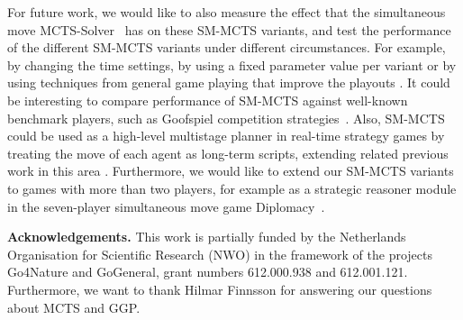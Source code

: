 \documentclass[conference]{IEEEtran}
\begin{document}
For future work, we would like to also measure the effect that the simultaneous move MCTS-Solver~\cite[Chapter 6]{Finnsson12} has on these 
SM-MCTS variants, and test the performance of the different SM-MCTS variants under different circumstances. For example, by changing the time settings, 
by using a fixed parameter value per variant or by using techniques from general game playing that improve the playouts \cite{Bjornsson09CadiaPlayer}.
It could be interesting to compare performance of SM-MCTS against well-known benchmark players, such as Goofspiel competition 
strategies~\cite{Dror13Repeated}.
Also, SM-MCTS could be used as a high-level multistage planner in real-time strategy games by treating the move of each agent
as long-term scripts, extending related previous work in this area \cite{Sailor07adversarial}. 
Furthermore, we would like to extend our SM-MCTS variants to games with more than two players, for example as a strategic reasoner 
module in the seven-player simultaneous move game Diplomacy~\cite{Fabregues11DipGame}.

{\bf Acknowledgements.} {\small This work is partially funded by the Netherlands Organisation for
Scientific Research (NWO) in the framework of the projects Go4Nature and GoGeneral, grant numbers 
612.000.938 and 612.001.121. Furthermore, we want to thank Hilmar Finnsson for answering our questions about MCTS and GGP.}

%
%
\end{document}
